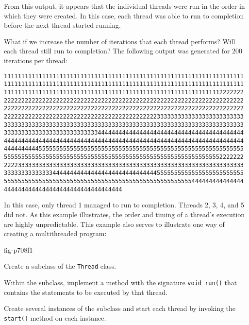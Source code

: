 \noindent From this output, it appears that the individual threads
were run in the order in which they were created.  In this case, each
thread was able to run to completion before the next thread started
running.

What if we increase the number of iterations that each thread performs?
Will each thread still run to completion? The following output was
generated for 200 iterations per thread:

\begin{jjjlisting}
\begin{lstlisting}[basicstyle=\scriptsize]
111111111111111111111111111111111111111111111111111111111111111111111
111111111111111111111111111111111111111111111111111111111111111111111
111111111111111111111111111111111111111111111111111111111111112222222
222222222222222222222222222222222222222222222222222222222222222222222
222222222222222222222222222222222222222222222222222222222222222222222
222222222222222222222222222222222222222222223333333333333333333333333
333333333333333333333333333333333333333333333333333333333333333333333
333333333333333333333333333444444444444444444444444444444444444444444
444444444444444444444444444444444444444444444444444444444444444444444
444444444455555555555555555555555555555555555555555555555555555555555
555555555555555555555555555555555555555555555555555555555555552222222
222233333333333333333333333333333333333333333333333333333333333333333
333333333333334444444444444444444444444444445555555555555555555555555
555555555555555555555555555555555555555555555555555555444444444444444
4444444444444444444444444444444444
\end{lstlisting}
\end{jjjlisting}

\noindent In this case, only thread 1 managed to run
to completion.  Threads 2, 3, 4, and 5 did not.  As this example
illustrates, the order and timing of a thread's execution are highly
unpredictable.  This example also serves to illustrate one way of
creating a multithreaded program:

{fig-p708f1}


\begin{BL}
\item Create a subclass of the {\tt Thread} class.
\item Within the subclass, implement a method with the signature 
 {\tt void run()} that contains the statements to be executed by that
 thread.
\item Create several instances of the subclass and start each
 thread by invoking the {\tt start()} method on each instance.
\end{BL}


